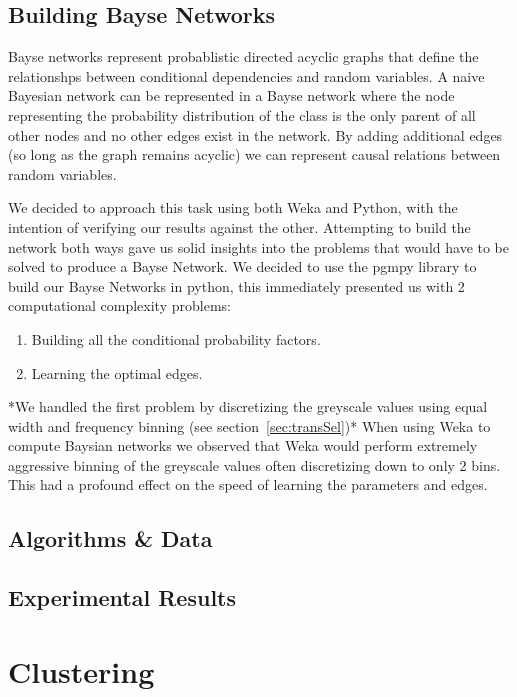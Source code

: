 \documentclass[11pt]{article}
\begin{document}
\subsection{Building Bayse Networks}
Bayse networks represent probablistic directed acyclic graphs that define the relationshps between conditional dependencies and random variables. 
A naive Bayesian network can be represented in a Bayse network where the node representing the probability distribution of the class is the only parent of all other nodes and no other edges exist in the network. 
By adding additional edges (so long as the graph remains acyclic) we can represent causal relations between random variables.
\par
We decided to approach this task using both Weka and Python, with the intention of verifying our results against the other.
Attempting to build the network both ways gave us solid insights into the problems that would have to be solved to produce a Bayse Network.
We decided to use the pgmpy library to build our Bayse Networks in python, this immediately presented us with 2 computational complexity problems:
\begin{enumerate}
    \item Building all the conditional probability factors.
    \item Learning the optimal edges.
\end{enumerate}

*We handled the first problem by discretizing the greyscale values using equal width and frequency binning (see section~\ref{sec:transSel})*
When using Weka to compute Baysian networks we observed that Weka would perform extremely aggressive binning of the greyscale values often discretizing down to only 2 bins. This had a profound effect on the speed of learning the parameters and edges.

\subsection{Algorithms \& Data}


\subsection{Experimental Results}


\pagebreak

\section{Clustering}
\end{document}
